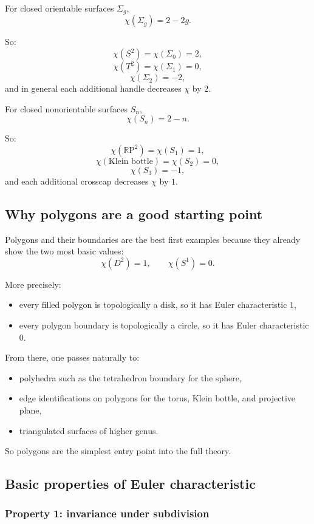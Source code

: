 \documentclass[12pt,a4paper]{article}
\newcommand{\RP}{\mathbb{R}\mathrm{P}}
\theoremstyle{notespace}
\begin{document}
For closed orientable surfaces \(\Sigma_g\),
\[
\chi(\Sigma_g)=2-2g.
\]

So:
\[
\chi(S^2)=\chi(\Sigma_0)=2,
\]
\[
\chi(T^2)=\chi(\Sigma_1)=0,
\]
\[
\chi(\Sigma_2)=-2,
\]
and in general each additional handle decreases \(\chi\) by \(2\).

For closed nonorientable surfaces \(S_n\),
\[
\chi(S_n)=2-n.
\]

So:
\[
\chi(\RP^2)=\chi(S_1)=1,
\]
\[
\chi(\text{Klein bottle})=\chi(S_2)=0,
\]
\[
\chi(S_3)=-1,
\]
and each additional crosscap decreases \(\chi\) by \(1\).

\subsection{Why polygons are a good starting point}

Polygons and their boundaries are the best first examples because they already show the two most basic values:
\[
\chi(D^2)=1,\qquad \chi(S^1)=0.
\]

More precisely:
\begin{itemize}
	\item every filled polygon is topologically a disk, so it has Euler characteristic \(1\),
	\item every polygon boundary is topologically a circle, so it has Euler characteristic \(0\).
\end{itemize}

From there, one passes naturally to:
\begin{itemize}
	\item polyhedra such as the tetrahedron boundary for the sphere,
	\item edge identifications on polygons for the torus, Klein bottle, and projective plane,
	\item triangulated surfaces of higher genus.
\end{itemize}

So polygons are the simplest entry point into the full theory.

\subsection{Basic properties of Euler characteristic}

\subsubsection*{Property 1: invariance under subdivision}
\end{document}
